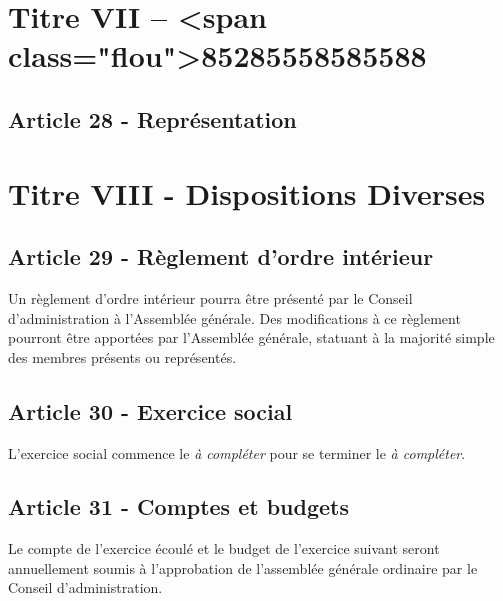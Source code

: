 \documentclass[12pt]{article}
\begin{document}
\section*{Titre VII – <span class="flou">85285558585588}
\subsection*{Article 28 - Représentation}
\section*{Titre VIII - Dispositions Diverses}

\subsection*{Article 29 - Règlement d'ordre intérieur}
Un règlement d'ordre intérieur pourra être présenté par le Conseil d'administration à l'Assemblée générale. Des modifications à ce règlement pourront être apportées par l'Assemblée générale, statuant à la majorité simple  des membres présents ou représentés.

\subsection*{Article 30 - Exercice social}
L'exercice social commence le \emph{à compléter} pour se terminer le \emph{à compléter}.

\subsection*{Article 31 - Comptes et budgets}
Le compte de l'exercice écoulé et le budget de l'exercice suivant seront annuellement soumis à l'approbation de l'assemblée générale ordinaire par le Conseil d'administration.
\end{document}
